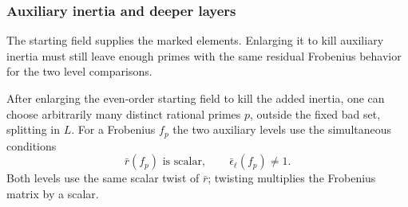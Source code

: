 \subsubsection{Auxiliary inertia and deeper layers}

The starting field supplies the marked elements. Enlarging it to kill auxiliary inertia must still leave enough primes with the same residual Frobenius behavior for the two level comparisons.

\begin{proposition}\label{prop:count-ii-auxiliary-primes}
After enlarging the even-order starting field to kill the added
inertia, one can choose arbitrarily many distinct rational primes \(p\), outside the fixed bad set, splitting in \(L\). For a Frobenius \(f_p\) the two auxiliary levels use the simultaneous conditions 
\[
 \bar r(f_p)\text{ is scalar},\qquad \bar\epsilon_\ell(f_p)\ne1.
\]
 Both levels use the same scalar twist of \(\bar r\); twisting multiplies the Frobenius matrix by a scalar.
\end{proposition}

